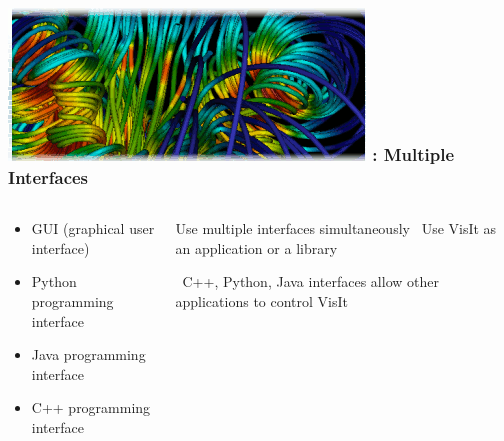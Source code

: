 \begin{frame}
\frametitle{\href{https://wci.llnl.gov/simulation/computer-codes/visit/}{\includegraphics[height=.85cm]{figs/visit-logos/VisIt-01}} \hspace{-.85cm}{\bf \textcolor{white}{VisIt}}: Multiple Interfaces}

\begin{columns}
\begin{column}{4.75cm}
\begin{itemize}
        \item GUI (graphical user interface)
        \item Python programming interface
        \item Java programming interface
        \item C++ programming interface
\end{itemize}
\end{column}
\begin{column}{7.25cm}
\pause
\begin{beamerboxesrounded}[upper=block head,lower=block body,shadow=true]{ Use multiple interfaces simultaneously}
        ~Use VisIt as an application or a library

        ~C++, Python, Java interfaces allow other applications to control VisIt
\end{beamerboxesrounded}
\end{column}
\end{columns}
\end{frame}


